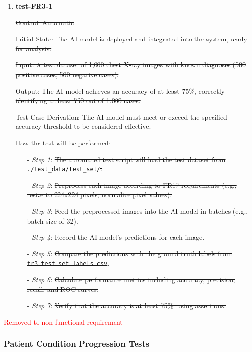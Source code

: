 \documentclass[12pt, titlepage]{article}
\begin{document}
\begin{enumerate}

\item \textbf{\sout{test-FR3-1}} \label{test-FR3-1}

\sout{Control: Automatic}

\sout{Initial State: The AI model is deployed and integrated into the system, ready for analysis.}

\sout{Input: A test dataset of 1,000 chest X-ray images with known diagnoses (500 positive cases, 500 negative cases).}

\sout{Output: The AI model achieves an accuracy of at least 75\%, correctly identifying at least 750 out of 1,000 cases.}

\sout{Test Case Derivation: The AI model must meet or exceed the specified accuracy threshold to be considered effective.}

\sout{How the test will be performed:}
\begin{itemize}
  \item[-] \textit{Step 1}: \sout{The automated test script will load the test dataset from \texttt{./test\_data/test\_set/}.}
  \item[-] \textit{Step 2}: \sout{Preprocess each image according to FR17 requirements (e.g., resize to 224x224 pixels, normalize pixel values).}
  \item[-] \textit{Step 3}: \sout{Feed the preprocessed images into the AI model in batches (e.g., batch size of 32).}
  \item[-] \textit{Step 4}: \sout{Record the AI model's predictions for each image.}
  \item[-] \textit{Step 5}: \sout{Compare the predictions with the ground truth labels from \texttt{fr3\_test\_set\_labels.csv}.}
  \item[-] \textit{Step 6}: \sout{Calculate performance metrics including accuracy, precision, recall, and ROC curves.}
  \item[-] \textit{Step 7}: \sout{Verify that the accuracy is at least 75\%, using assertions.}
\end{itemize}

\end{enumerate}
\textcolor{red}{Removed to non-functional requirement}


\subsubsection{Patient Condition Progression Tests}
\end{document}
